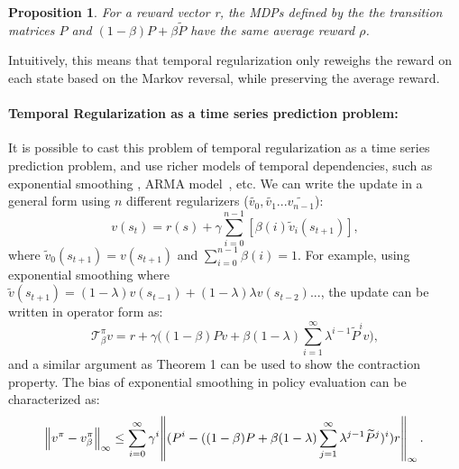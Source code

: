 \documentclass{article}
\newtheorem{proposition}{Proposition}
\newcommand{\param}{\beta}
\newcommand{\pol}{\pi}
\newcommand{\T}{\mathcal{T}}
\newcommand{\V}{v}
\newcommand{\regT}{\T^{\pol}_{\param}}
\begin{document}
\begin{proposition}
For a reward vector r, the MDPs defined by the the transition matrices $P$ and $(1-\param) P + \param \widetilde{P}$ have the same average reward $\rho$.
\end{proposition}
Intuitively, this means that temporal regularization only reweighs the reward on each state based on the Markov reversal, while preserving the average reward.

\paragraph{Temporal Regularization as a time series prediction problem:}
It is possible to cast this problem of temporal regularization as a time series prediction problem, and use richer models of temporal dependencies, such as exponential smoothing \citep{gardner2006exponential}, ARMA model~\citep{box94}, etc. We can write the update in a general form using $n$ different regularizers ($\widetilde{v_0},\widetilde{v_1}...\widetilde{v_{n-1}}$):
\begin{equation}
    \V(s_t) = r(s) + \gamma \sum_{i=0}^{n-1} [\param(i) \widetilde{\V}_i(s_{t+1})],
\end{equation}
where $\widetilde{\V}_0(s_{t+1}) = \V(s_{t+1})$ and $\sum_{i=0}^{n-1} \param(i) = 1$. For example, using exponential smoothing where $\widetilde{\V}(s_{t+1}) = (1-\lambda) \V(s_{t-1}) + (1-\lambda)\lambda \V(s_{t-2})...$, the update can be written in operator form as:
\begin{equation}
    \label{eq:exp_smooth}
    \regT v = r + \gamma \bigg(\left(1-\param\right) Pv + \param \left(1-\lambda\right) \sum_{i=1}^{\infty} \lambda^{i-1} \widetilde{P}^i v\bigg),
\end{equation}
and a similar argument as Theorem 1 can be used to show the contraction property. The bias of exponential smoothing in policy evaluation can be characterized as:
\begin{equation}
        \norm{v^{\pol} - v^{\pol}_{\param}}_{\infty} \leq  \sum_{i=0}^{\infty} \gamma^i \norm{ (P^i-((1-\param) P + \param (1-\lambda) \sum_{j=1}^{\infty} \lambda^{j-1} \widetilde{P}^j)^i) r}_{\infty}.
\end{equation}
\end{document}

